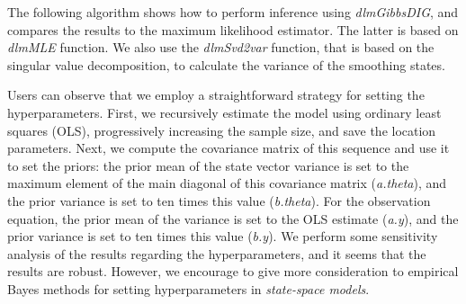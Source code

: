 The following algorithm shows how to perform inference using \textit{dlmGibbsDIG}, and compares the results to the maximum likelihood estimator. The latter is based on \textit{dlmMLE} function. We also use the \textit{dlmSvd2var} function, that is based on the singular value decomposition, to calculate the variance of the smoothing states.

Users can observe that we employ a straightforward strategy for setting the hyperparameters. First, we recursively estimate the model using ordinary least squares (OLS), progressively increasing the sample size, and save the location parameters. Next, we compute the covariance matrix of this sequence and use it to set the priors: the prior mean of the state vector variance is set to the maximum element of the main diagonal of this covariance matrix (\textit{a.theta}), and the prior variance is set to ten times this value (\textit{b.theta}). For the observation equation, the prior mean of the variance is set to the OLS estimate (\textit{a.y}), and the prior variance is set to ten times this value (\textit{b.y}). We perform some sensitivity analysis of the results regarding the hyperparameters, and it seems that the results are robust. However, we encourage to give more consideration to empirical Bayes methods for setting hyperparameters in \textit{state-space models}.

